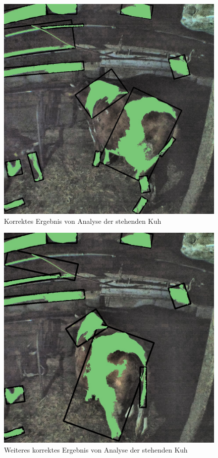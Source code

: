 \begin{figure}[H]
	\center
	\includegraphics[scale=0.1]{Grafiken/resultate/resultatStanding2.jpg}
	\caption{Korrektes Ergebnis von Analyse der stehenden Kuh} 
	\label{fig: Korrektes Ergebnis von Analyse der stehenden Kuh} 
\end{figure}



\begin{figure}[H]
	\center
	\includegraphics[scale=0.1]{Grafiken/resultate/resultatStanding1.jpg}
	\caption{Weiteres korrektes Ergebnis von Analyse der stehenden Kuh} 
	\label{fig: Weiteres korrektes Ergebnis von Analyse der stehenden Kuh} 
\end{figure}

